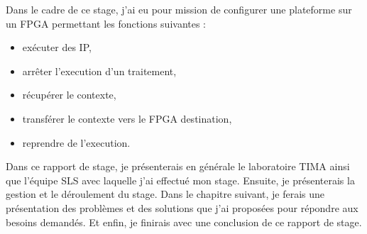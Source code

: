 Dans le cadre de ce stage, j'ai eu pour mission de configurer une plateforme sur un FPGA permettant les fonctions suivantes :
\begin{itemize}
\item exécuter des IP,
\item arrêter l'execution d'un traitement,
\item récupérer le contexte,
\item transférer le contexte vers le FPGA destination,
\item reprendre de l'execution.
\end{itemize}

Dans ce rapport de stage, je présenterais en générale le laboratoire TIMA ainsi que l'équipe SLS avec laquelle j'ai effectué mon stage. Ensuite, je présenterais la gestion et le déroulement du stage. Dans le chapitre suivant, je ferais une présentation des problèmes et des solutions que j'ai proposées pour répondre aux besoins demandés. Et enfin, je finirais avec une conclusion de ce rapport de stage.